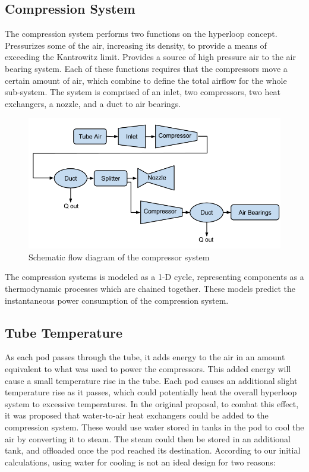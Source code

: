 \documentclass[heading.tex]{subfiles}
\begin{document}
\subsection{Compression System}

The compression system performs two functions on the hyperloop concept.
Pressurizes some of the air, increasing its density, to provide a means of exceeding the Kantrowitz limit.
Provides a source of high pressure air to the air bearing system.
Each of these functions requires that the compressors move a certain amount of air, which combine to define the total airflow for the whole
sub-system. The system is comprised of an inlet, two compressors, two heat exchangers, a nozzle, and a duct to air bearings.

\begin{figure}[hbtp]
\centering
\includegraphics[scale=0.5]{images/compressor_schematic.png}
\caption{Schematic flow diagram of the compressor system}
\end{figure}

The compression systems is modeled as a 1-D cycle, representing components as a thermodynamic processes which are chained together.
These models predict the instantaneous power consumption of the compression system.

\subsection{Tube Temperature}

As each pod passes through the tube, it adds energy to the air in an amount equivalent to what was used to power the compressors. This
added energy will cause a small temperature rise in the tube. Each pod causes an additional slight temperature rise as it passes, which could
potentially heat the overall hyperloop system to excessive temperatures. In the original proposal, to combat this effect, it was proposed
that water-to-air heat exchangers could be added to the compression system. These would use water stored in tanks in the pod to cool the
air by converting it to steam. The steam could then be stored in an additional tank, and offloaded once the pod reached its destination.
According to our initial calculations, using water for cooling is not an ideal design for two reasons:
\end{document}

